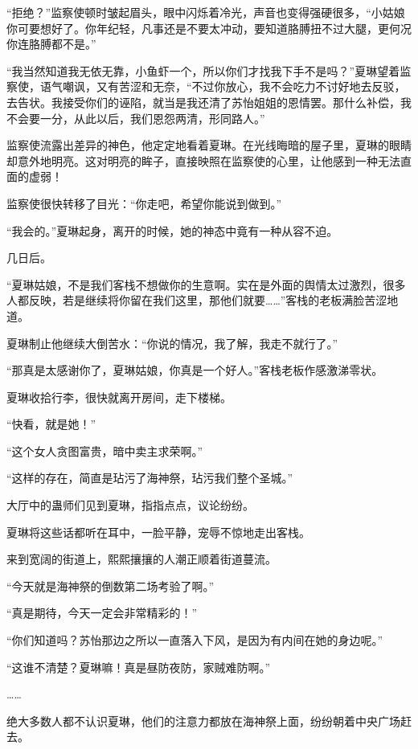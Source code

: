 
\begin{this_body}

“拒绝？”监察使顿时皱起眉头，眼中闪烁着冷光，声音也变得强硬很多，“小姑娘你可要想好了。你年纪轻，凡事还是不要太冲动，要知道胳膊扭不过大腿，更何况你连胳膊都不是。”

“我当然知道我无依无靠，小鱼虾一个，所以你们才找我下手不是吗？”夏琳望着监察使，语气嘲讽，又有苦涩和无奈，“不过你放心，我不会吃力不讨好地去反驳，去告状。我接受你们的诬陷，就当是我还清了苏怡姐姐的恩情罢。那什么补偿，我不会要一分，从此以后，我们恩怨两清，形同路人。”

监察使流露出差异的神色，他定定地看着夏琳。在光线晦暗的屋子里，夏琳的眼睛却意外地明亮。这对明亮的眸子，直接映照在监察使的心里，让他感到一种无法直面的虚弱！

监察使很快转移了目光：“你走吧，希望你能说到做到。”

“我会的。”夏琳起身，离开的时候，她的神态中竟有一种从容不迫。

几日后。

“夏琳姑娘，不是我们客栈不想做你的生意啊。实在是外面的舆情太过激烈，很多人都反映，若是继续将你留在我们这里，那他们就要……”客栈的老板满脸苦涩地道。

夏琳制止他继续大倒苦水：“你说的情况，我了解，我走不就行了。”

“那真是太感谢你了，夏琳姑娘，你真是一个好人。”客栈老板作感激涕零状。

夏琳收拾行李，很快就离开房间，走下楼梯。

“快看，就是她！”

“这个女人贪图富贵，暗中卖主求荣啊。”

“这样的存在，简直是玷污了海神祭，玷污我们整个圣城。”

大厅中的蛊师们见到夏琳，指指点点，议论纷纷。

夏琳将这些话都听在耳中，一脸平静，宠辱不惊地走出客栈。

来到宽阔的街道上，熙熙攘攘的人潮正顺着街道蔓流。

“今天就是海神祭的倒数第二场考验了啊。”

“真是期待，今天一定会非常精彩的！”

“你们知道吗？苏怡那边之所以一直落入下风，是因为有内间在她的身边呢。”

“这谁不清楚？夏琳嘛！真是昼防夜防，家贼难防啊。”

……

绝大多数人都不认识夏琳，他们的注意力都放在海神祭上面，纷纷朝着中央广场赶去。


\end{this_body}
